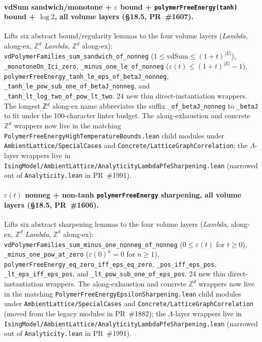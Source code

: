 \documentclass[a4paper,11pt]{article}
\begin{document}
\paragraph{vdSum sandwich/monotone + $\varepsilon$ bound +
\texttt{polymerFreeEnergy(tanh)} bound + $\log 2$, all volume
layers (\S18.5, PR~\#1607).} Lifts six abstract bound/regularity
lemmas to the four volume layers (\textit{Lambda}, along-ex,
$\mathbb{Z}^d$ \textit{Lambda}, $\mathbb{Z}^d$ along-ex):
\texttt{vdPolymerFamilies\_sum\_sandwich\_of\_nonneg}
($1 \le \mathrm{vdSum} \le (1+t)^{|E|}$),
\texttt{\_monotoneOn\_Ici\_zero},
\texttt{\_minus\_one\_le\_of\_nonneg}
($\varepsilon(t) \le (1+t)^{|E|} - 1$),
\texttt{polymerFreeEnergy\_tanh\_le\_eps\_of\_betaJ\_nonneg},
\texttt{\_tanh\_le\_pow\_sub\_one\_of\_betaJ\_nonneg}, and
\texttt{\_tanh\_lt\_log\_two\_of\_pow\_lt\_two}. 24 new thin
direct-instantiation wrappers. The longest ℤ$^d$ along-ex name
abbreviates the suffix \texttt{\_of\_betaJ\_nonneg} to
\texttt{\_betaJ} to fit under the 100-character linter budget.
The along-exhaustion and concrete $\mathbb{Z}^d$ wrappers now live in the
matching \texttt{PolymerFreeEnergyHighTemperatureBounds.lean} child modules
under \texttt{AmbientLattice/SpecialCases} and
\texttt{Concrete/LatticeGraphCorrelation}; the $\Lambda$-layer wrappers live
in \texttt{IsingModel/AmbientLattice/AnalyticityLambdaPfeSharpening.lean}
(narrowed out of \texttt{Analyticity.lean} in PR~\#1991).

\paragraph{$\varepsilon(t)$ nonneg + non-tanh
\texttt{polymerFreeEnergy} sharpening, all volume layers (\S18.5,
PR~\#1606).} Lifts six abstract sharpening lemmas to the four
volume layers (\textit{Lambda}, along-ex, $\mathbb{Z}^d$ \textit{Lambda},
$\mathbb{Z}^d$ along-ex):
\texttt{vdPolymerFamilies\_sum\_minus\_one\_nonneg\_of\_nonneg}
($0 \le \varepsilon(t)$ for $t \ge 0$),
\texttt{\_minus\_one\_pow\_at\_zero}
($\varepsilon(0)^n = 0$ for $n \ge 1$),
\texttt{polymerFreeEnergy\_eq\_zero\_iff\_eps\_eq\_zero},
\texttt{\_pos\_iff\_eps\_pos},
\texttt{\_lt\_eps\_iff\_eps\_pos}, and
\texttt{\_lt\_pow\_sub\_one\_of\_eps\_pos}. 24 new thin
direct-instantiation wrappers.
The along-exhaustion and concrete $\mathbb{Z}^d$ wrappers now live in the
matching \texttt{PolymerFreeEnergyEpsilonSharpening.lean} child modules under
\texttt{AmbientLattice/SpecialCases} and
\texttt{Concrete/LatticeGraphCorrelation} (moved from the legacy modules in
PR~\#1882); the $\Lambda$-layer wrappers live in
\texttt{IsingModel/AmbientLattice/AnalyticityLambdaPfeSharpening.lean}
(narrowed out of \texttt{Analyticity.lean} in PR~\#1991).
\end{document}
